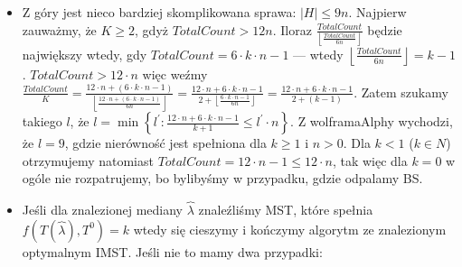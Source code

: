 \begin{itemize}
	\item Z góry jest nieco bardziej skomplikowana sprawa: $\left| H \right| \leqslant 9n$. Najpierw zauważmy, że $K \geqslant 2$, gdyż $TotalCount > 12n$. Iloraz $\frac{TotalCount}{\left \lfloor \frac{TotalCount}{6n} \right \rfloor}$ będzie największy wtedy, gdy $TotalCount = 6 \cdot k \cdot n - 1$ --- wtedy $\left \lfloor \frac{TotalCount}{6n} \right \rfloor = k - 1$. $TotalCount > 12 \cdot n$ więc weźmy $\frac{TotalCount}{K} = \frac{12 \cdot n + \left( 6 \cdot k \cdot n - 1\right)}{\left \lfloor \frac{12 \cdot n + \left( 6 \cdot k \cdot n - 1\right)}{6n} \right \rfloor} = \frac{12 \cdot n + 6 \cdot k \cdot n - 1}{2 + \left \lfloor \frac{6 \cdot k \cdot n - 1}{6n} \right \rfloor} = \frac{12 \cdot n + 6 \cdot k \cdot n - 1}{2 + \left( k - 1 \right)}$. Zatem szukamy takiego $l$, że $ l = \min \left\{ l^{\prime} : \frac{12 \cdot n + 6 \cdot k \cdot n - 1}{k + 1} \leqslant l^{\prime} \cdot n \right\}$. Z wolframaAlphy wychodzi, że $l = 9$, gdzie nierówność jest spełniona dla $k \geqslant 1$ i $n > 0$. Dla $k < 1$ ($k \in N$) otrzymujemy natomiast $TotalCount = 12 \cdot n - 1 \leqslant 12 \cdot n$, tak więc dla $k = 0$ w ogóle nie rozpatrujemy, bo bylibyśmy w przypadku, gdzie odpalamy BS.
	
	
	\item Jeśli dla znalezionej mediany $\overbrace{\lambda}$ znaleźliśmy MST, które spełnia $f \left( T \left( \overbrace{\lambda} \right), T^{0} \right) = k$ wtedy się cieszymy i kończymy algorytm ze znalezionym optymalnym IMST. Jeśli nie to mamy dwa przypadki:
	

\end{itemize}
